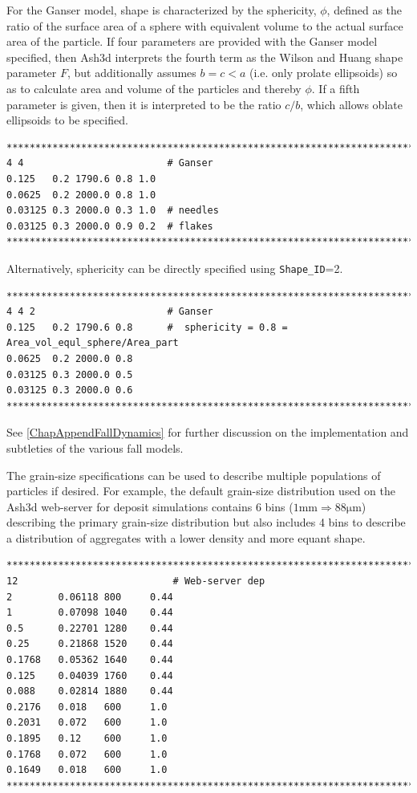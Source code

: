 \normalsize
For the Ganser model, shape is characterized by the sphericity, $\phi$, defined as the
ratio of the surface area of a sphere with equivalent volume to the actual surface area
of the particle. If four parameters are provided with the Ganser model specified, then
Ash3d interprets the fourth term as the Wilson and Huang shape parameter $F$, but
additionally assumes $b=c<a$ (i.e. only prolate ellipsoids) so as to calculate area and
volume of the particles and thereby $\phi$.
If a fifth parameter is given, then it is interpreted to 
be the ratio $c/b$, which allows oblate ellipsoids to be specified.
\small
\begin{verbatim}
*******************************************************************************
4 4                         # Ganser
0.125   0.2 1790.6 0.8 1.0
0.0625  0.2 2000.0 0.8 1.0
0.03125 0.3 2000.0 0.3 1.0  # needles
0.03125 0.3 2000.0 0.9 0.2  # flakes
*******************************************************************************
\end{verbatim}
\normalsize
Alternatively, sphericity can be directly specified using \texttt{Shape\_ID}=2.
\small
\begin{verbatim}
*******************************************************************************
4 4 2                       # Ganser
0.125   0.2 1790.6 0.8      #  sphericity = 0.8 = Area_vol_equl_sphere/Area_part
0.0625  0.2 2000.0 0.8
0.03125 0.3 2000.0 0.5
0.03125 0.3 2000.0 0.6
*******************************************************************************
\end{verbatim}
\normalsize
See \ref{ChapAppendFallDynamics} for further discussion on the implementation and
subtleties of the various fall models.

The grain-size specifications can be used to describe multiple populations of particles
if desired. For example, the default grain-size distribution used on the Ash3d
web-server for deposit simulations contains 6 bins
($1 \mathrm{mm} \Rightarrow 88 \mathrm{\mu m}$) describing the primary grain-size distribution
but also includes 4 bins to describe a distribution of aggregates with a lower density
and more equant shape.
\small
\begin{verbatim}
*******************************************************************************
12                           # Web-server dep
2        0.06118 800     0.44
1        0.07098 1040    0.44
0.5      0.22701 1280    0.44
0.25     0.21868 1520    0.44
0.1768   0.05362 1640    0.44
0.125    0.04039 1760    0.44
0.088    0.02814 1880    0.44
0.2176   0.018   600     1.0
0.2031   0.072   600     1.0
0.1895   0.12    600     1.0
0.1768   0.072   600     1.0
0.1649   0.018   600     1.0
*******************************************************************************
\end{verbatim}
\normalsize

